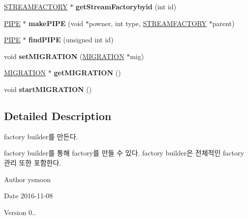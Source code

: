 \begin{DoxyCompactItemize}
\item 
\hypertarget{classFACTORYBUILDER_a9c5c5c444ed7a2d1dc2c098793fb10a6}{}\hyperlink{classSTREAMFACTORY}{S\+T\+R\+E\+A\+M\+F\+A\+C\+T\+O\+R\+Y} $\ast$ {\bfseries get\+Stream\+Factorybyid} (int id)\label{classFACTORYBUILDER_a9c5c5c444ed7a2d1dc2c098793fb10a6}

\item 
\hypertarget{classFACTORYBUILDER_a457513572fcf3e64bee6cac741df0a3f}{}\hyperlink{classPIPE}{P\+I\+P\+E} $\ast$ {\bfseries make\+P\+I\+P\+E} (void $\ast$powner, int type, \hyperlink{classSTREAMFACTORY}{S\+T\+R\+E\+A\+M\+F\+A\+C\+T\+O\+R\+Y} $\ast$parent)\label{classFACTORYBUILDER_a457513572fcf3e64bee6cac741df0a3f}

\item 
\hypertarget{classFACTORYBUILDER_ac9de10dd42a596ef75df704e19cd2ce2}{}\hyperlink{classPIPE}{P\+I\+P\+E} $\ast$ {\bfseries find\+P\+I\+P\+E} (unsigned int id)\label{classFACTORYBUILDER_ac9de10dd42a596ef75df704e19cd2ce2}

\item 
\hypertarget{classFACTORYBUILDER_aeb2912e73dafc162b3e0b7cdbc7fe943}{}void {\bfseries set\+M\+I\+G\+R\+A\+T\+I\+O\+N} (\hyperlink{classMIGRATION}{M\+I\+G\+R\+A\+T\+I\+O\+N} $\ast$mig)\label{classFACTORYBUILDER_aeb2912e73dafc162b3e0b7cdbc7fe943}

\item 
\hypertarget{classFACTORYBUILDER_a9af3fdebefbbde78627bcb1dd11d2ede}{}\hyperlink{classMIGRATION}{M\+I\+G\+R\+A\+T\+I\+O\+N} $\ast$ {\bfseries get\+M\+I\+G\+R\+A\+T\+I\+O\+N} ()\label{classFACTORYBUILDER_a9af3fdebefbbde78627bcb1dd11d2ede}

\item 
\hypertarget{classFACTORYBUILDER_abee07310623351029b708dbd38210cc2}{}void {\bfseries start\+M\+I\+G\+R\+A\+T\+I\+O\+N} ()\label{classFACTORYBUILDER_abee07310623351029b708dbd38210cc2}

\end{DoxyCompactItemize}


\subsection{Detailed Description}
factory builder를 만든다. 

factory builder를 통해 factory를 만들 수 있다. factory builder은 전체적인 factory 관리 또한 포함한다. \begin{DoxyAuthor}{Author}
ysmoon 
\end{DoxyAuthor}
\begin{DoxyDate}{Date}
2016-\/11-\/08 
\end{DoxyDate}
\begin{DoxyVersion}{Version}
0.. 
\end{DoxyVersion}



